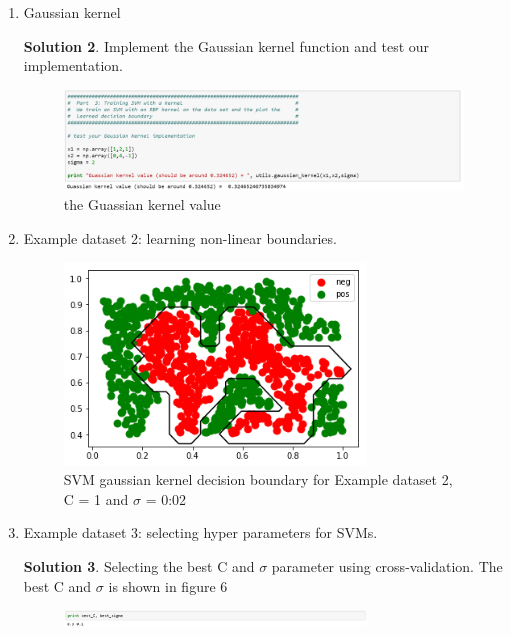 \documentclass[]{book}
\theoremstyle{definition}
\newtheorem*{soln}{Solution}
\begin{document}
\begin{enumerate}
\begin{soln}
\begin{figure}[H]
			\caption{SVM decision boundary with C = 100 for Example dataset 1}
			\label{fig:3}
		\end{figure}
		When C = 1, we can see that the boundary misclass an example. It's because of the weak regulation. As C increase, the penalty for misclassification will be larger, resulting less misclassified points.
	\end{soln}
	\item Gaussian kernel
	\begin{soln}
		Implement the Gaussian kernel function and test our implementation.
		\begin{figure}[H]
			\centering
			\includegraphics[width=12cm]{gaussian.png}
			\caption{the Guassian kernel value }
			\label{fig:4}
		\end{figure}
	\end{soln}
	\item Example dataset 2: learning non-linear boundaries.
	\begin{figure}[H]
		\centering
		\includegraphics[width=8cm]{dataSet2.png}
		\caption{SVM gaussian kernel decision boundary for Example dataset 2, C = 1 and $\sigma$ = 0:02 }
		\label{fig:5}
	\end{figure}
	\item Example dataset 3: selecting hyper parameters for SVMs.
	\begin{soln}
		Selecting the best C and $\sigma$ parameter using cross-validation. The best C and $\sigma$ is shown in figure 6
		\begin{figure}[H]
			\centering
			\includegraphics[width=8cm]{bestc.png}

\end{figure}
\end{soln}
\end{enumerate}
\end{document}
